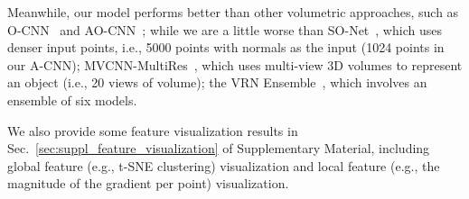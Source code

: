 \documentclass[10pt,twocolumn,letterpaper]{article}
\begin{document}
Meanwhile, our model performs better than other volumetric approaches, such as O-CNN~\cite{wang2017cnn} and AO-CNN~\cite{Wang-2018-AOCNN}; while we are a little worse than SO-Net~\cite{li2018so}, which uses denser input points, i.e., 5000 points with normals as the input (1024 points in our A-CNN); MVCNN-MultiRes~\cite{qi2016volumetric}, which uses multi-view 3D volumes to represent an object (i.e., 20 views of  volume); the VRN Ensemble~\cite{brock2016generative}, which involves an ensemble of six models.

We also provide some feature visualization results in Sec.~\ref{sec:suppl_feature_visualization} of Supplementary Material, including global feature (e.g., t-SNE clustering) visualization and local feature (e.g., the magnitude of the gradient per point) visualization.
\vspace{-2mm}
\end{document}
